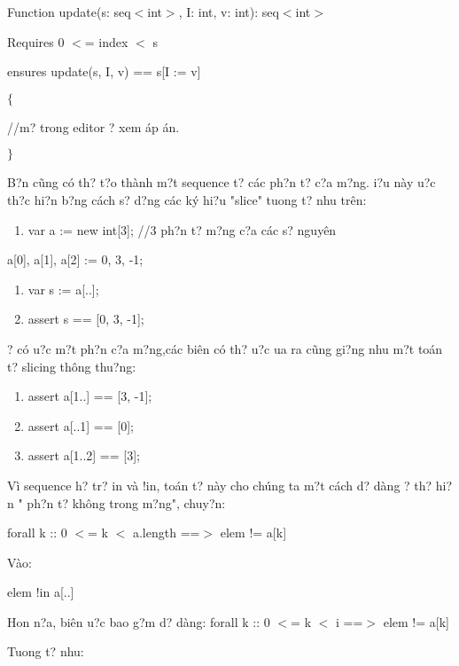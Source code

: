 \documentclass{article} %
\begin{document}
Function update(s: seq$<$int$>$, I: int, v: int): seq$<$int$>$

Requires 0 $<$= index $<$ {\textbar}s{\textbar}

ensures update(s, I, v) == s[I := v]

\noindent $\{$

//m? trong editor {\dj}? xem {\dj}\'{a}p \'{a}n.

\noindent $\}$

B?n c\~{u}ng c\'{o} th? t?o th\`{a}nh m?t sequence t? c\'{a}c ph?n t? c?a m?ng. {\DJ}i?u n\`{a}y {\dj}u?c th?c hi?n b?ng c\'{a}ch s? d?ng c\'{a}c k\'{y} hi?u "slice" tuong t? nhu tr\^{e}n:

\begin{enumerate}
\item  var a := new int[3]; //3 ph?n t? m?ng c?a c\'{a}c s? nguy\^{e}n
\end{enumerate}

a[0], a[1], a[2] := 0, 3, -1;

\begin{enumerate}
\item  var s := a[..];

\item  assert s == [0, 3, -1];
\end{enumerate}

{\DJ}? c\'{o} {\dj}u?c m?t ph?n c?a m?ng,c\'{a}c bi\^{e}n c\'{o} th? {\dj}u?c {\dj}ua ra c\~{u}ng gi?ng nhu m?t to\'{a}n t? slicing th\^{o}ng thu?ng:

\begin{enumerate}
\item  assert a[1..] == [3, -1];

\item  assert a[..1] == [0];

\item  assert a[1..2] == [3];
\end{enumerate}

V\`{i} sequence h? tr? in v\`{a} !in, to\'{a}n t? n\`{a}y cho ch\'{u}ng ta m?t c\'{a}ch d? d\`{a}ng {\dj}? th? hi?n " ph?n t? kh\^{o}ng trong m?ng", chuy?n:

forall k :: 0 $<$= k $<$ a.length ==$>$ elem != a[k]

\noindent V\`{a}o:

elem !in a[..]

\noindent Hon n?a, bi\^{e}n {\dj}u?c bao g?m d? d\`{a}ng: forall k :: 0 $<$= k $<$ i ==$>$ elem != a[k]

\noindent Tuong t? nhu:
\end{document}

